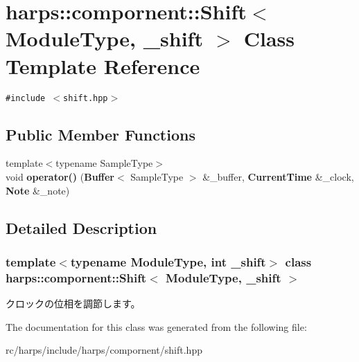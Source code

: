 \section{harps::compornent::Shift$<$ ModuleType, \_\-shift $>$ Class Template Reference}
\label{classharps_1_1compornent_1_1Shift}
{\tt \#include $<$shift.hpp$>$}

\subsection*{Public Member Functions}
\begin{CompactItemize}
\item 
{\footnotesize template$<$typename SampleType$>$ }\\void \textbf{operator()} ({\bf Buffer}$<$ SampleType $>$ \&\_\-buffer, {\bf CurrentTime} \&\_\-clock, {\bf Note} \&\_\-note)\label{classharps_1_1compornent_1_1Shift_0593f851fbfe75035df973052f7b4868}

\end{CompactItemize}


\subsection{Detailed Description}
\subsubsection*{template$<$typename ModuleType, int \_\-shift$>$ class harps::compornent::Shift$<$ ModuleType, \_\-shift $>$}

クロックの位相を調節します。 

The documentation for this class was generated from the following file:\begin{CompactItemize}
\item 
rc/harps/include/harps/compornent/shift.hpp\end{CompactItemize}
